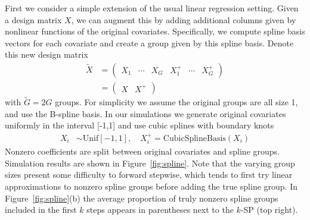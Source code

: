 \documentclass{imsart}
\begin{document}
First we consider a simple extension of the usual linear regression setting. Given a design matrix $X$, we can augment this by adding additional columns given by nonlinear functions of the original covariates. Specifically, we compute spline basis vectors for each covariate and create a group given by this spline basis. Denote this new design matrix
\begin{equation}
\label{eq:splinemat}
  \begin{aligned}
    \tilde X &=  \begin{pmatrix} X_1 & \cdots & X_G & X^+_1 & \cdots & X^+_G  \end{pmatrix}\\
    &= \begin{pmatrix} X & X^+ \end{pmatrix}
  \end{aligned}
\end{equation}
with $\tilde G = 2G$ groups. For simplicity we assume the original groups are all size 1, and use the B-spline basis. In our simulations we generate original covariates uniformly in the interval [-1,1] and use cubic splines with boundary knots
\begin{equation}
  \begin{aligned}
    X_i &\sim \text{Unif}[-1,1], \quad
    X_i^+ = \text{CubicSplineBasis}(X_i)
  \end{aligned}
\end{equation}
Nonzero coefficients are split between original covariates and spline groups. Simulation results are shown in Figure~\ref{fig:spline}. Note that the varying group sizes present some difficulty to forward stepwise, which tends to first try linear approximations to nonzero spline groups before adding the true spline group. In Figure~\ref{fig:spline}(b) the average proportion of truly nonzero spline groups included in the first $k$ steps appears in parentheses next to the $k$-SP (top right).
\end{document}
